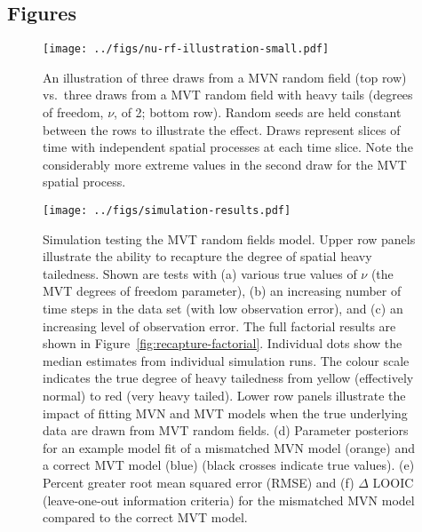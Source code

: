 \documentclass[12pt,english]{article}
\begin{document}
\begin{spacing}{1.9}


\clearpage

\section{Figures}

\begin{figure}[htb]
  \begin{center}
    \texttt{[image: ../figs/nu-rf-illustration-small.pdf]}
    \caption{An illustration of three draws from a MVN random field (top row)
      vs.\ three draws from a MVT random field with heavy tails
      (degrees of freedom, $\nu$, of 2; bottom row). Random seeds are held constant
      between the rows
      to illustrate the effect. Draws represent slices of time with independent spatial
      processes at each time slice. Note the considerably more extreme values in
      the second draw for the MVT spatial process.}
    \label{fig:nu}
  \end{center}
\end{figure}

\clearpage

\begin{figure}[htb]
  \begin{center}
    \texttt{[image: ../figs/simulation-results.pdf]}
    \caption{Simulation testing the MVT random fields model.
      Upper row
      panels illustrate the ability to recapture the
      degree of spatial heavy tailedness.
      Shown are tests with
      (a) various true values of $\nu$ (the MVT degrees of freedom parameter),
      (b) an increasing number of time steps in the data set (with low observation error),
      and (c) an increasing level of observation error.
      The full factorial results are shown in Figure~\ref{fig:recapture-factorial}.
      Individual dots show the median estimates from individual simulation runs.
      The colour scale indicates the true degree of heavy tailedness from
      yellow (effectively normal) to red (very heavy tailed).
      Lower row panels illustrate the impact of fitting MVN and MVT models
      when the true underlying data are drawn from MVT random fields.
      (d) Parameter posteriors for an
      example model fit of a mismatched MVN model (orange)
      and a correct MVT model (blue) (black crosses indicate true values).
      (e) Percent greater root mean squared error (RMSE)
      and (f) $\Delta$ LOOIC (leave-one-out information criteria)
      for the mismatched MVN model compared to the correct MVT model.
    }
    \label{fig:recapture}
  \end{center}
\end{figure}


\end{spacing}
\end{document}
